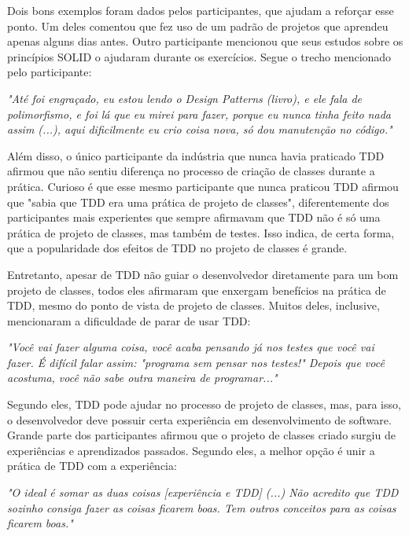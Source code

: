 \documentclass[conference]{IEEEtran}
\begin{document}
Dois bons exemplos foram dados pelos participantes, que ajudam a reforçar esse ponto. Um deles
comentou que fez uso de um padrão de projetos \cite{gof} que aprendeu apenas alguns dias antes.
Outro participante mencionou que seus estudos sobre os princípios SOLID
o ajudaram durante os exercícios. Segue o trecho mencionado pelo participante:

\begin{framed}
\textit{"Até foi engraçado, eu estou lendo o Design Patterns (livro), e ele fala de polimorfismo, e foi
lá que eu mirei para fazer, porque eu nunca tinha feito nada assim (...), aqui dificilmente eu crio
coisa nova, só dou manutenção no código."}
\end{framed}

Além disso, o único participante da indústria que nunca havia
praticado TDD afirmou que não sentiu diferença no processo de criação de classes durante
a prática.
Curioso é que esse mesmo participante que nunca praticou TDD afirmou que "sabia que TDD era uma prática de projeto de classes",
diferentemente dos participantes mais experientes que sempre afirmavam que TDD não é só uma prática de projeto de classes,
mas também de testes. Isso indica, de certa forma, que a popularidade dos efeitos de TDD no projeto de classes
é grande.

Entretanto, apesar de TDD não guiar o desenvolvedor diretamente para um bom projeto de classes,
todos eles afirmaram que enxergam benefícios na prática de TDD, mesmo do
ponto de vista de projeto de classes. Muitos deles, inclusive, mencionaram a dificuldade
de parar de usar TDD:

\begin{framed}
\textit{"Você vai fazer alguma coisa, você acaba pensando já nos testes que você vai fazer. É difícil 
falar assim: "programa sem pensar nos testes!" Depois que você acostuma, você não sabe outra
maneira de programar..."}
\end{framed}

Segundo eles, TDD pode ajudar no processo de projeto de classes, mas, para isso,
o desenvolvedor deve possuir certa experiência em desenvolvimento de software. 
Grande parte dos participantes afirmou que o 
projeto de classes criado surgiu de experiências e aprendizados passados.
Segundo eles, a melhor opção é unir a prática de TDD com a experiência:

\begin{framed}
\textit{"O ideal é somar as duas coisas [experiência e TDD] (...) 
Não acredito que TDD sozinho consiga fazer as coisas ficarem boas. Tem outros conceitos
para as coisas ficarem boas."}
\end{framed}
\end{document}
